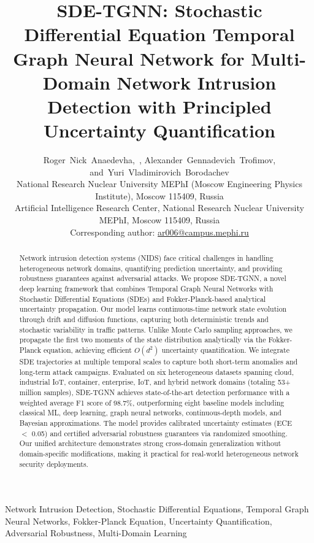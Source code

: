 \documentclass[10pt,journal,compsoc]{IEEEtran}
\title{SDE-TGNN: Stochastic Differential Equation Temporal Graph Neural Network for Multi-Domain Network Intrusion Detection with Principled Uncertainty Quantification}
\author{%
Roger~Nick~Anaedevha,~\IEEEmembership{Student Member,~IEEE}\IEEEauthorrefmark{1},
Alexander~Gennadevich~Trofimov\IEEEauthorrefmark{1},
and~Yuri~Vladimirovich~Borodachev\IEEEauthorrefmark{2}\\
\IEEEauthorrefmark{1}National Research Nuclear University MEPhI (Moscow Engineering Physics Institute), Moscow 115409, Russia\\
\IEEEauthorrefmark{2}Artificial Intelligence Research Center, National Research Nuclear University MEPhI, Moscow 115409, Russia\\
Corresponding author: \href{mailto:ar006@campus.mephi.ru}{ar006@campus.mephi.ru}
}
\begin{document}
\maketitle

\begin{abstract}
Network intrusion detection systems (NIDS) face critical challenges in handling heterogeneous network domains, quantifying prediction uncertainty, and providing robustness guarantees against adversarial attacks. We propose SDE-TGNN, a novel deep learning framework that combines Temporal Graph Neural Networks with Stochastic Differential Equations (SDEs) and Fokker-Planck-based analytical uncertainty propagation. Our model learns continuous-time network state evolution through drift and diffusion functions, capturing both deterministic trends and stochastic variability in traffic patterns. Unlike Monte Carlo sampling approaches, we propagate the first two moments of the state distribution analytically via the Fokker-Planck equation, achieving efficient $O(d^2)$ uncertainty quantification. We integrate SDE trajectories at multiple temporal scales to capture both short-term anomalies and long-term attack campaigns. Evaluated on six heterogeneous datasets spanning cloud, industrial IoT, container, enterprise, IoT, and hybrid network domains (totaling 53+ million samples), SDE-TGNN achieves state-of-the-art detection performance with a weighted average F1 score of 98.7\%, outperforming eight baseline models including classical ML, deep learning, graph neural networks, continuous-depth models, and Bayesian approximations. The model provides calibrated uncertainty estimates (ECE $<$ 0.05) and certified adversarial robustness guarantees via randomized smoothing. Our unified architecture demonstrates strong cross-domain generalization without domain-specific modifications, making it practical for real-world heterogeneous network security deployments.
\end{abstract}

\vspace{-0.2cm}

\begin{IEEEkeywords}
Network Intrusion Detection, Stochastic Differential Equations, Temporal Graph Neural Networks, Fokker-Planck Equation, Uncertainty Quantification, Adversarial Robustness, Multi-Domain Learning
\end{IEEEkeywords}

\IEEEpeerreviewmaketitle

\vspace{-0.2cm}
\end{document}
